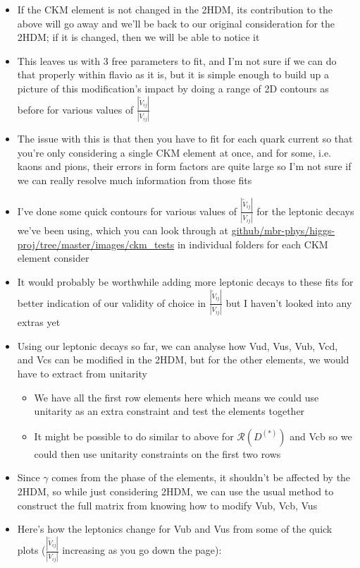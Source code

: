 \documentclass[11pt]{article}
\newcommand{\tVV}{\frac{|\tilde{V}_{ij}|}{|V_{ij}|}}
\begin{document}
\begin{itemize}
    \item If the CKM element is not changed in the 2HDM, its contribution to the above will go away and we'll be back to our original consideration for the 2HDM; if it is changed, then we will be able to notice it
    \item This leaves us with 3 free parameters to fit, and I'm not sure if we can do that properly within flavio as it is, but it is simple enough to build up a picture of this modification's impact by doing a range of 2D contours as before for various values of $\tVV$
    \item The issue with this is that then you have to fit for each quark current so that you're only considering a single CKM element at once, and for some, i.e. kaons and pions, their errors in form factors are quite large so I'm not sure if we can really resolve much information from those fits
    \item I've done some quick contours for various values of $\tVV$ for the leptonic decays we've been using, which you can look through at \href{https://github.com/mbr-phys/higgs-proj/tree/master/images/ckm_tests}{github/mbr-phys/higgs-proj/tree/master/images/ckm\_tests} in individual folders for each CKM element consider
    \item It would probably be worthwhile adding more leptonic decays to these fits for better indication of our validity of choice in $\tVV$ but I haven't looked into any extras yet
    \item Using our leptonic decays so far, we can analyse how Vud, Vus, Vub, Vcd, and Vcs can be modified in the 2HDM, but for the other elements, we would have to extract from unitarity 
        \begin{itemize}
            \item We have all the first row elements here which means we could use unitarity as an extra constraint and test the elements together
            \item It might be possible to do similar to above for $\mathcal{R}(D^{(*)})$ and Vcb so we could then use unitarity constraints on the first two rows
        \end{itemize}
    \item Since $\gamma$ comes from the phase of the elements, it shouldn't be affected by the 2HDM, so while just considering 2HDM, we can use the usual method to construct the full matrix from knowing how to modify Vub, Vcb, Vus
    \item Here's how the leptonics change for Vub and Vus from some of the quick plots ($\tVV$ increasing as you go down the page):
\end{itemize}
\end{document}

